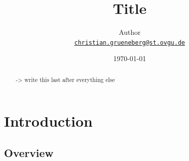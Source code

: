 \documentclass[
	12pt,
	a4paper,
	abstract,
	bibliography=totoc,
	chapterprefix,
	headings=openright,
	numbers=endperiod,
	parskip=half,
	twoside,
]{scrreprt}
\title{Title}
\author{
Author\\
{\large\href{mailto:christian.grueneberg@st.ovgu.de}{\nolinkurl{christian.grueneberg@st.ovgu.de}}}
}
\date{\today}
\begin{document}
{}

\maketitle

\begin{abstract}


-> write this last after everything else

\end{abstract}

\tableofcontents

\cleardoubleoddpage
{}

\chapter{Introduction}
\label{cha:introduction}


\section{Overview}



\end{document}
